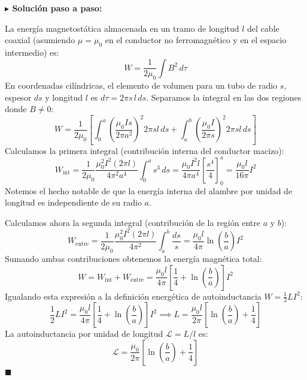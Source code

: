 \documentclass[11pt,a4paper]{book}
\newenvironment{solucion}{%
    \par\medskip\noindent\textbf{\color{blue!65!black}\Large $\blacktriangleright$ Solución paso a paso:}\par\medskip
}{%
    \hfill$\blacksquare$\par\bigskip
}
\begin{document}
\begin{solucion}
La energía magnetostática almacenada en un tramo de longitud $l$ del cable coaxial (asumiendo $\mu = \mu_0$ en el conductor no ferromagnético y en el espacio intermedio) es:
\begin{equation}
    W = \frac{1}{2\mu_0} \int B^2 \, d\tau
\end{equation}
En coordenadas cilíndricas, el elemento de volumen para un tubo de radio $s$, espesor $ds$ y longitud $l$ es $d\tau = 2\pi s \, l \, ds$. Separamos la integral en las dos regiones donde $B \neq 0$:
\begin{equation}
    W = \frac{1}{2\mu_0} \left[ \int_{0}^{a} \left(\frac{\mu_0 I s}{2\pi a^2}\right)^2 2\pi s l \, ds + \int_{a}^{b} \left(\frac{\mu_0 I}{2\pi s}\right)^2 2\pi s l \, ds \right]
\end{equation}
Calculamos la primera integral (contribución interna del conductor macizo):
\begin{equation}
    W_{\text{int}} = \frac{1}{2\mu_0} \frac{\mu_0^2 I^2 (2\pi l)}{4\pi^2 a^4} \int_{0}^{a} s^3 \, ds = \frac{\mu_0 I^2 l}{4\pi a^4} \left[ \frac{s^4}{4} \right]_{0}^{a} = \frac{\mu_0 l}{16\pi} I^2
\end{equation}
Notemos el hecho notable de que la energía interna del alambre por unidad de longitud es independiente de su radio $a$.

Calculamos ahora la segunda integral (contribución de la región entre $a$ y $b$):
\begin{equation}
    W_{\text{entre}} = \frac{1}{2\mu_0} \frac{\mu_0^2 I^2 (2\pi l)}{4\pi^2} \int_{a}^{b} \frac{ds}{s} = \frac{\mu_0 l}{4\pi} \ln\left(\frac{b}{a}\right) I^2
\end{equation}
Sumando ambas contribuciones obtenemos la energía magnética total:
\begin{equation}
    W = W_{\text{int}} + W_{\text{entre}} = \frac{\mu_0 l}{4\pi} \left[ \frac{1}{4} + \ln\left(\frac{b}{a}\right) \right] I^2
\end{equation}
Igualando esta expresión a la definición energética de autoinductancia $W = \frac{1}{2} L I^2$:
\begin{equation}
    \frac{1}{2} L I^2 = \frac{\mu_0 l}{4\pi} \left[ \frac{1}{4} + \ln\left(\frac{b}{a}\right) \right] I^2 \implies L = \frac{\mu_0 l}{2\pi} \left[ \ln\left(\frac{b}{a}\right) + \frac{1}{4} \right]
\end{equation}
La autoinductancia por unidad de longitud $\mathcal{L} = L/l$ es:
\begin{equation}
    \mathcal{L} = \frac{\mu_0}{2\pi} \left[ \ln\left(\frac{b}{a}\right) + \frac{1}{4} \right]
\end{equation}
\end{solucion}
\end{document}
